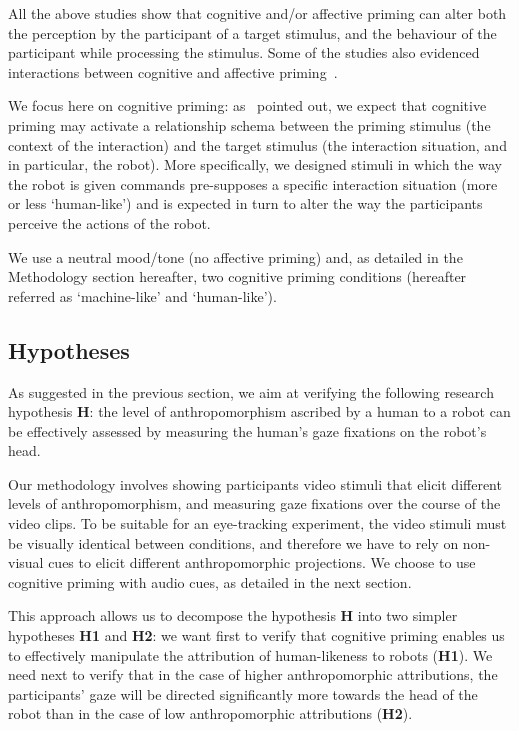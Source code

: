 \documentclass[lettersize, noapacite, twoside, HRI]{apa_HRI}
\newcommand{\h}[1]{\textbf{H#1}\xspace}
\begin{document}
All the above studies show that cognitive and/or affective priming can alter
both the perception by the participant of a target stimulus, and the behaviour
of the participant while processing the stimulus. Some of the studies also
evidenced interactions between cognitive and affective
priming~\citep{yi1990cognitive,storbeck2008affective}.

We focus here on cognitive priming: as~\cite{baldwin1990priming} pointed out, we
expect that cognitive priming may activate a relationship schema between the
priming stimulus (the context of the interaction) and the
target stimulus (the interaction situation, and in particular, the robot).
More specifically, we designed stimuli in which the way the robot is given
commands pre-supposes a specific interaction situation (more or less
`human-like') and is expected in turn to alter the way the participants perceive the
actions of the robot.

We use a neutral mood/tone (no affective priming) and, as detailed in the
Methodology section hereafter, two cognitive priming conditions (hereafter
referred as `machine-like' and `human-like').



\subsection{Hypotheses}

As suggested in the previous section, we aim at verifying the following research
hypothesis \h{}: the level of anthropomorphism ascribed by a human to a robot can be
effectively assessed by measuring the human's gaze fixations on the robot's head.

Our methodology involves showing participants video stimuli that elicit
different levels of anthropomorphism, and measuring gaze fixations over the
course of the video clips. To be suitable for an eye-tracking experiment, the
video stimuli must be visually identical between conditions, and therefore
we have to rely on non-visual cues to elicit different anthropomorphic
projections. We choose to use cognitive priming with audio cues, as detailed in
the next section.

This approach allows us to decompose the hypothesis \h{} into two simpler
hypotheses \h{1} and \h{2}: we want first to verify that cognitive priming
enables us to effectively manipulate the attribution of human-likeness to robots
(\h{1}).  We need next to verify that in the case of higher anthropomorphic
attributions, the participants' gaze will be directed significantly more towards
the head of the robot than in the case of low anthropomorphic attributions
(\h{2}).
\end{document}
